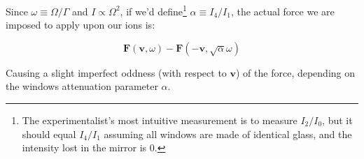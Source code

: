 Since $\omega \equiv \Omega/\Gamma$ and $I \propto \Omega^2$, if we'd define\footnote{The experimentalist's most intuitive measurement is to measure $I_2/I_0$, but it should equal $I_4/I_1$ assuming all windows are made of identical glass, and the intensity lost in the mirror is 0.} $\alpha \equiv I_4/I_1$, the actual force we are imposed to apply upon our ions is:

\begin{equation}
    \mathbf{F}(\mathbf{v}, \omega) - \mathbf{F}(-\mathbf{v}, \sqrt{\alpha}\omega)
\end{equation}

Causing a slight imperfect oddness (with respect to $\mathbf{v}$) of the force, depending on the windows attenuation parameter $\alpha$.

%
%
%
%
%
%
%
